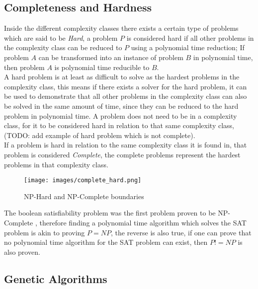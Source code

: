 \subsection{Completeness and Hardness}
\label{subsection:cpandh}

Inside the different complexity classes there exists a certain type of problems which are said to be \textit{Hard}, a problem $P$ is considered hard if all other problems in the complexity class can be reduced to $P$ using a polynomial time reduction; If problem $A$ can be transformed into an instance of problem $B$ in polynomial time, then problem $A$ is polynomial time reducible to $B$.
\\A hard problem is at least as difficult to solve as the hardest problems in the complexity class, this means if there exists a solver for the hard problem, it can be used to demonstrate that all other problems in the complexity class can also be solved in the same amount of time, since they can be reduced to the hard problem in polynomial time.
A problem does not need to be in a complexity class, for it to be considered hard in relation to that same complexity class, (TODO: add example of hard problem which is not complete).
\\If a problem is hard in relation to the same complexity class it is found in, that problem is considered \textit{Complete}, the complete problems represent the hardest problems in that complexity class.

\begin{figure}[!ht]
	\centering
	\texttt{[image: images/complete\_hard.png]}
	\caption{ NP-Hard and NP-Complete boundaries}
	\label{fig:NP_boundaries}
\end{figure}

The boolean satisfiability problem was the first problem proven to be NP-Complete \parencite{Cook1971}, therefore finding a polynomial time algorithm which solves the SAT problem is akin to proving $P=NP$, the reverse is also true, if one can prove that no polynomial time algorithm for the SAT problem can exist, then $P!=NP$ is also proven. 


\subsection{Genetic Algorithms}
\label{subsection:ga_prelim}


